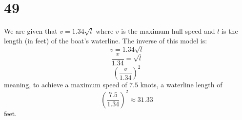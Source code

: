 \documentclass{article}
\theoremstyle{definition}
\begin{document}
\section*{49}
We are given that $v=1.34\sqrt{l}$ where $v$ is the maximum hull speed and $l$ is the length (in feet) of the boat's waterline. The inverse of this model 
is: 
\[ v=1.34\sqrt{l} \]
\[ \frac{v}{1.34}=\sqrt{l} \]
\[ (\frac{v}{1.34})^2 \]
meaning, to achieve a maximum speed of $7.5$ knots, a waterline length of 
\[ (\frac{7.5}{1.34})^2\approx 31.33 \] feet.
\end{document}
